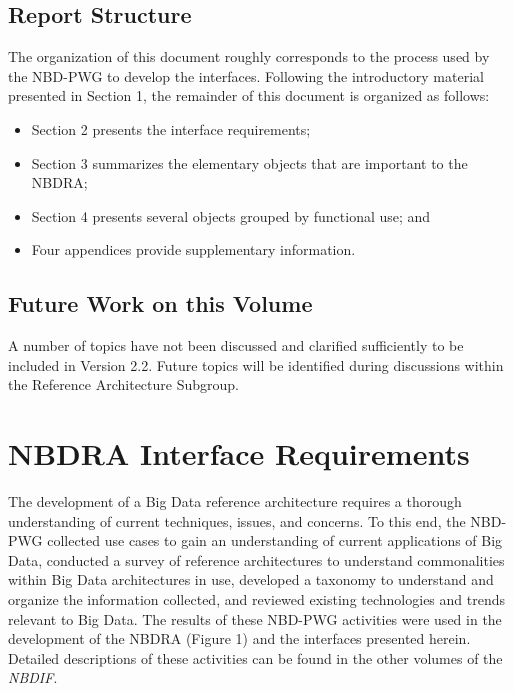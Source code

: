 \documentclass[9pt,]{article}
\providecommand{\tightlist}{%
  \setlength{\itemsep}{0pt}\setlength{\parskip}{0pt}}
\begin{document}
\hypertarget{report-structure}{%
\subsection{Report Structure}\label{report-structure}}

The organization of this document roughly corresponds to the process
used by the NBD-PWG to develop the interfaces. Following the
introductory material presented in Section 1, the remainder of this
document is organized as follows:

\begin{itemize}
\tightlist
\item
  Section 2 presents the interface requirements;
\item
  Section 3 summarizes the elementary objects that are important to the
  NBDRA;
\item
  Section 4 presents several objects grouped by functional use; and
\item
  Four appendices provide supplementary information.
\end{itemize}

\hypertarget{future-work-on-this-volume}{%
\subsection{Future Work on this
Volume}\label{future-work-on-this-volume}}

A number of topics have not been discussed and clarified sufficiently to
be included in Version 2.2. Future topics will be identified during
discussions within the Reference Architecture Subgroup.

\hypertarget{nbdra-interface-requirements}{%
\section{NBDRA Interface
Requirements}\label{nbdra-interface-requirements}}

The development of a Big Data reference architecture requires a thorough
understanding of current techniques, issues, and concerns. To this end,
the NBD-PWG collected use cases to gain an understanding of current
applications of Big Data, conducted a survey of reference architectures
to understand commonalities within Big Data architectures in use,
developed a taxonomy to understand and organize the information
collected, and reviewed existing technologies and trends relevant to Big
Data. The results of these NBD-PWG activities were used in the
development of the NBDRA (Figure 1) and the interfaces presented herein.
Detailed descriptions of these activities can be found in the other
volumes of the \emph{NBDIF}.
\end{document}

